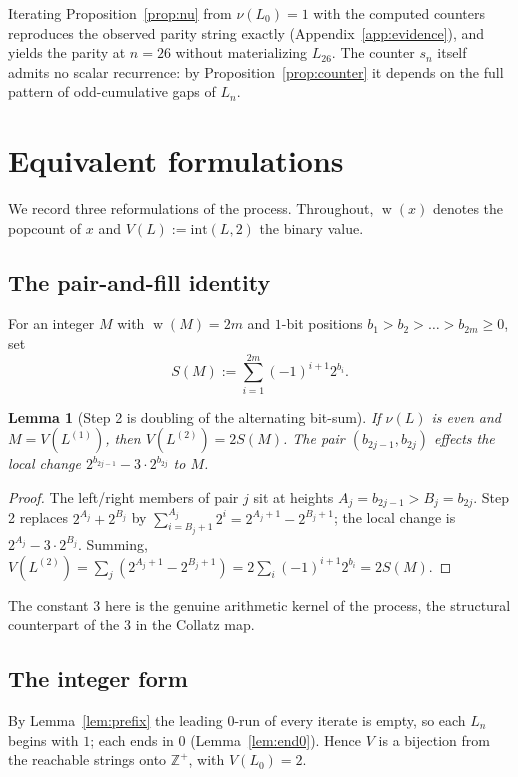 \documentclass[11pt,reqno]{amsart}
\theoremstyle{plain}
\newtheorem{lemma}{Lemma}
\theoremstyle{definition}
\theoremstyle{remark}
\DeclareMathOperator{\popcount}{w}
\begin{document}
Iterating Proposition~\ref{prop:nu} from $\nu(L_0)=1$ with the computed counters reproduces the observed parity string exactly (Appendix~\ref{app:evidence}), and yields the parity at $n=26$ without materializing $L_{26}$. The counter $s_n$ itself admits no scalar recurrence: by Proposition~\ref{prop:counter} it depends on the full pattern of odd-cumulative gaps of $L_n$.

\section{Equivalent formulations}\label{sec:equiv}
We record three reformulations of the process. Throughout, $\popcount(x)$ denotes the popcount of $x$ and $V(L):=\mathrm{int}(L,2)$ the binary value.

\subsection{The pair-and-fill identity}\label{sec:10.1}
For an integer $M$ with $\popcount(M)=2m$ and $1$-bit positions $b_1>b_2>\dots>b_{2m}\ge 0$, set
\[ S(M):=\sum_{i=1}^{2m}(-1)^{i+1}2^{b_i}. \]

\begin{lemma}[Step 2 is doubling of the alternating bit-sum]\label{lem:S}
If $\nu(L)$ is even and $M=V(L^{(1)})$, then $V(L^{(2)})=2S(M)$. The pair $(b_{2j-1},b_{2j})$ effects the local change $2^{b_{2j-1}}-3\cdot 2^{b_{2j}}$ to $M$.
\end{lemma}
\begin{proof}
The left/right members of pair $j$ sit at heights $A_j=b_{2j-1}>B_j=b_{2j}$. Step 2 replaces $2^{A_j}+2^{B_j}$ by $\sum_{i=B_j+1}^{A_j}2^i=2^{A_j+1}-2^{B_j+1}$; the local change is $2^{A_j}-3\cdot 2^{B_j}$. Summing, $V(L^{(2)})=\sum_j(2^{A_j+1}-2^{B_j+1})=2\sum_i(-1)^{i+1}2^{b_i}=2S(M)$.
\end{proof}

The constant $3$ here is the genuine arithmetic kernel of the process, the structural counterpart of the $3$ in the Collatz map.

\subsection{The integer form}\label{sec:10.2}
By Lemma~\ref{lem:prefix} the leading $0$-run of every iterate is empty, so each $L_n$ begins with $1$; each ends in $0$ (Lemma~\ref{lem:end0}). Hence $V$ is a bijection from the reachable strings onto $\mathbb Z^+$, with $V(L_0)=2$.
\end{document}
